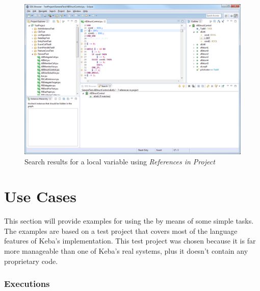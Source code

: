 \begin{figure}[p]
  \centering
    \includegraphics[width=\textwidth]{bilder/manual-search}
  \caption{Search results for a local variable using \emph{References in Project}}
  \label{fig:manual-search}
\end{figure}



\section{Use Cases} \label{sec:manual-usecases}



This section will provide examples for using the \SB by means of some simple tasks. The examples are based on a test 
project that covers most of the language features of Keba's \IEC implementation. This test project was chosen because 
it is far more manageable than one of Keba's real systems, plus it doesn't contain any proprietary code.

\subsubsection{Executions}

